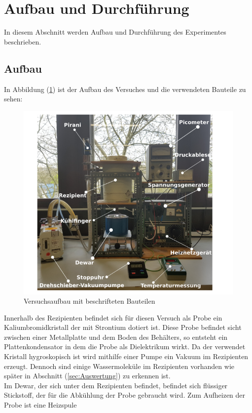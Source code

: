 \section{Aufbau und Durchführung}
\label{sec:Durchführung}
In diesem Abschnitt werden Aufbau und Durchführung des Experimentes beschrieben.
\subsection{Aufbau}
\label{sec:durchff1}
In Abbildung (\ref{fig:aufbau48}) ist der Aufbau des Versuches und die verwendeten Bauteile zu sehen:
\begin{figure}[h!]
  \centering
  \includegraphics[scale=0.5]{fig/aufbauv48.png}
  \caption{Versuchsaufbau mit beschrifteten Bauteilen \cite[2]{Anleitung1}}
  \label{fig:aufbau48}
\end{figure}
Innerhalb des Rezipienten befindet sich für diesen Versuch als Probe ein Kaliumbromidkristall der mit Strontium dotiert ist. Diese Probe befindet sicht zwischen einer Metallplatte
und dem Boden des Behälters, so entsteht ein Plattenkondensator in dem die Probe als Dielektrikum wirkt. Da der verwendet Kristall hygroskopisch ist wird mithilfe einer Pumpe ein
Vakuum im Rezipienten erzeugt. Dennoch sind einige Wassermoleküle im Rezipienten vorhanden wie später in Abschnitt (\ref{sec:Auswertung}) zu erkennen ist. \\
Im Dewar, der sich unter dem Rezipienten befindet, befindet sich flüssiger Stickstoff, der für die Abkühlung der Probe gebraucht wird. Zum Aufheizen der Probe ist eine Heizspule
